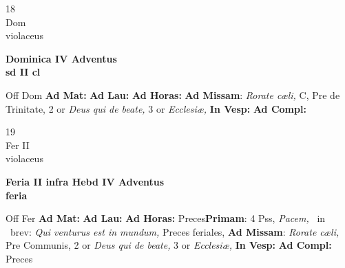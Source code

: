 \documentclass[10pt, openany]{book}
\begin{document}
        \begin{center}
            \begin{minipage}{3.5in}
                \vspace{2em}
                \begin{minipage}{0.5in}
                    {\Huge 18} \\
                    {\normalsize Dom} \\
                    {\normalsize violaceus}
                \end{minipage}
                \begin{minipage}{3.0in}
                    \textbf{ \large Dominica IV Adventus \\
                    \textnormal{\normalsize sd II cl}} \\ 
                \end{minipage}
                \begin{justify}Off Dom
                    \textbf{Ad Mat: }
                    \textbf{Ad Lau: }
                    \textbf{Ad Horas: }\textbf{Ad Missam}: \textit{Rorate cæli,} C, Pre de Trinitate, 2 or \textit{Deus qui de beate,} 3 or \textit{Ecclesiæ,}  
                    \textbf{In Vesp: }
                    \textbf{Ad Compl: }
                \end{justify}
            \end{minipage}
        \end{center}
    
        \begin{center}
            \begin{minipage}{3.5in}
                \vspace{2em}
                \begin{minipage}{0.5in}
                    {\Huge 19} \\
                    {\normalsize Fer II} \\
                    {\normalsize violaceus}
                \end{minipage}
                \begin{minipage}{3.0in}
                    \textbf{ \large Feria II infra Hebd IV Adventus \\
                    \textnormal{\normalsize feria}} \\ 
                \end{minipage}
                \begin{justify}Off Fer
                    \textbf{Ad Mat: }
                    \textbf{Ad Lau: }
                    \textbf{Ad Horas: }Preces\textbf{Primam}: 4 Pss, \textit{Pacem,} \Vbar\ in \Rbar\ brev: \textit{Qui venturus est in mundum,} Preces feriales, \textbf{Ad Missam}: \textit{Rorate cæli,} Pre Communis, 2 or \textit{Deus qui de beate,} 3 or \textit{Ecclesiæ,}  
                    \textbf{In Vesp: }
                    \textbf{Ad Compl: }Preces
                \end{justify}
            \end{minipage}
        \end{center}
    
\end{document}
